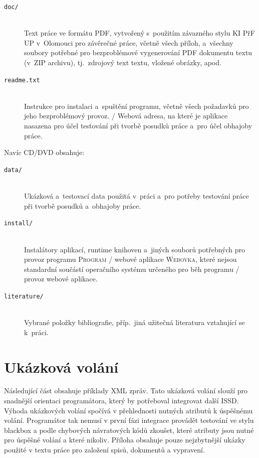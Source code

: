\documentclass[
  master,
  field=ainfp,
  biblatex,
  language=czech,
  glossaries,
  theorems=false,
  index
]{kidiplom}
\begin{document}
\begin{description}

\item[\texttt{doc/}] \hfill \\
  Text práce ve formátu PDF, vytvořený s~použitím závazného stylu KI
  PřF UP v~Olomouci pro závěrečné práce, včetně všech příloh,
  a~všechny soubory potřebné pro bezproblémové vygenerování PDF
  dokumentu textu (v~ZIP archivu), tj.~zdrojový text textu, vložené
  obrázky, apod.

\item[\texttt{readme.txt}] \hfill \\
  Instrukce pro instalaci a~spuštění programu, včetně
  všech požadavků pro jeho bezproblémový provoz. / Webová adresa, na
  které je aplikace nasazena pro účel testování při tvorbě posudků
  práce a~pro účel obhajoby práce.

\end{description}

Navíc CD/DVD obsahuje:

\begin{description}

\item[\texttt{data/}] \hfill \\
  Ukázková a~testovací data použitá v~práci a~pro potřeby testování
  práce při tvorbě posudků a~obhajoby práce.

\item[\texttt{install/}] \hfill \\
  Instalátory aplikací, runtime knihoven a~jiných souborů potřebných
  pro provoz programu \textsc{Program} / webové aplikace
  \textsc{Webovka}, které nejsou standardní součástí operačního
  systému určeného pro běh programu / provoz webové aplikace.

\item[\texttt{literature/}] \hfill \\
  Vybrané položky bibliografie, příp.~jiná užitečná literatura
  vztahující se k~práci.

\end{description}

\newpage
\section{Ukázková volání}\label{sec:XMLVolani}
Následující část obsahuje příklady XML zpráv. Tato ukázková volání slouží pro snadnější orientaci programátora, který by potřeboval integrovat další ISSD. Výhoda ukázkových volání spočívá v přehlednosti nutných atributů k úspěšnému volání. Programátor tak nemusí v první fázi integrace provádět testování ve stylu blackbox a podle chybových návratových kódů zkoušet, které atributy jsou nutné pro úspěšné volání a které nikoliv. Příloha obsahuje pouze nejzbytnější ukázky použité v textu práce pro založení spisů, dokumentů a vypravení.
\end{document}
